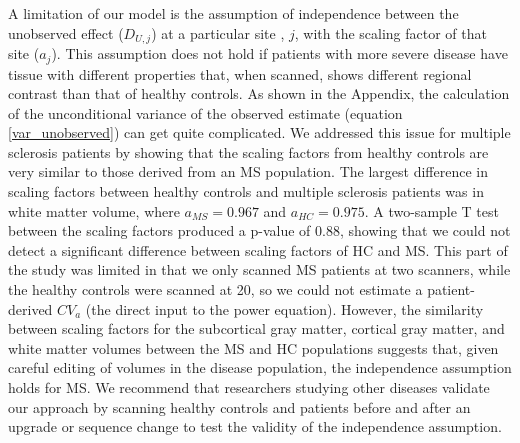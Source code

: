 \documentclass{article}
\begin{document}
A limitation of our model is the assumption of independence between the unobserved effect ($D_{U,j}$) at a particular site , $j$, with the scaling factor of that site ($a_j$). This assumption does not hold if patients with more severe disease have tissue with different properties that, when scanned, shows different regional contrast than that of healthy controls. As shown in the Appendix, the calculation of the unconditional variance of the observed estimate (equation \ref{var_unobserved}) can get quite complicated. We addressed this issue for multiple sclerosis patients by showing that the scaling factors from healthy controls are very similar to those derived from an MS population. The largest difference in scaling factors between healthy controls and multiple sclerosis patients was in white matter volume, where $a_{MS} = 0.967$ and $a_{HC} = 0.975$. A two-sample T test between the scaling factors produced a p-value of $0.88$, showing that we could not detect a significant difference between scaling factors of HC and MS. This part of the study was limited in that we only scanned MS patients at two scanners, while the healthy controls were scanned at 20, so we could not estimate a patient-derived $CV_a$ (the direct input to the power equation). However, the similarity between scaling factors for the subcortical gray matter, cortical gray matter, and white matter volumes between the MS and HC populations suggests that, given careful editing of volumes in the disease population, the independence assumption holds for MS. We recommend that researchers studying other diseases validate our approach by scanning healthy controls and patients before and after an upgrade or sequence change to test the validity of the independence assumption.
\end{document}

